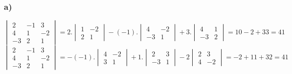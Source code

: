 \documentclass[11pt]{article}
\begin{document}
\subsubsection*{a)}
\[
\begin{vmatrix}
2 &-1 & 3\\
4 & 1 & -2\\
-3 & 2 & 1
\end{vmatrix}
=2.
\begin{vmatrix}
1 & -2 \\
2 & 1
\end{vmatrix}
-(-1).
\begin{vmatrix}
4 & -2 \\
-3 & 1
\end{vmatrix}
+3.
\begin{vmatrix}
4 & 1 \\
-3 & 2
\end{vmatrix}
= 10-2+33=41
\]
\[
\begin{vmatrix}
2 &-1 & 3\\
4 & 1 & -2\\
-3 & 2 & 1
\end{vmatrix}
=-(-1).
\begin{vmatrix}
4 & -2 \\
3 & 1
\end{vmatrix}
+1.
\begin{vmatrix}
2 & 3 \\
-3 & 1
\end{vmatrix}
-2
\begin{vmatrix}
2 & 3 \\
4 & -2
\end{vmatrix}
=-2+11+32=41
\]
\end{document}
